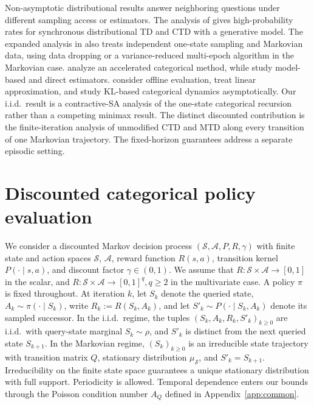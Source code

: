 \documentclass{article}
\newcommand{\X}{\mathcal{S}}
\newcommand{\A}{\mathcal{A}}
\begin{document}
Non-asymptotic distributional results answer neighboring questions under different sampling access or estimators. The analysis of \citet{peng2024statistical} gives high-probability rates for synchronous distributional TD and CTD with a generative model. The expanded analysis in \citep{peng2025statisticalefficiencydistributionaltemporal} also treats independent one-state sampling and Markovian data, using data dropping or a variance-reduced multi-epoch algorithm in the Markovian case. \citet{boeck2022speedy} analyze an accelerated categorical method, while \citet{zhang2023estimation,rowland2024near} study model-based and direct estimators. \citet{wu2023distributional} consider offline evaluation, \citet{peng2025finite} treat linear approximation, and \citet{kastner2025categorical} study KL-based categorical dynamics asymptotically. Our i.i.d.\ result is a contractive-SA analysis of the one-state categorical recursion rather than a competing minimax result. The distinct discounted contribution is the finite-iteration analysis of unmodified CTD and MTD along every transition of one Markovian trajectory. The fixed-horizon guarantees address a separate episodic setting.

\section{Discounted categorical policy evaluation}\label{sec:discounted}
We consider a discounted Markov decision process \citep{sutton1998reinforcement} $(\X,\A,P,R,\gamma)$ with finite state and action spaces $\X$, $\A$, reward function $R(s,a)$, transition kernel $P(\cdot\mid s,a)$, and discount factor $\gamma\in(0,1)$. We assume that $R:\X \times \A \to [0, 1]$ in the scalar, and $R:\X \times \A \to[0, 1]^q, q\ge2$ in the multivariate case. A policy $\pi$ is fixed throughout. At iteration $k$, let $S_k$ denote the queried state, $A_k\sim\pi(\cdot\mid S_k)$, write $R_k:=R(S_k,A_k)$, and let $S'_k\sim P(\cdot\mid S_k,A_k)$ denote its sampled successor. In the i.i.d.\ regime, the tuples $(S_k,A_k,R_k,S'_k)_{k\ge0}$ are i.i.d.\ with query-state marginal $S_k\sim\rho$, and $S'_k$ is distinct from the next queried state $S_{k+1}$. In the Markovian regime, $(S_k)_{k\ge0}$ is an irreducible state trajectory with transition matrix $Q$, stationary distribution $\mu_{\X}$, and $S'_k=S_{k+1}$. Irreducibility on the finite state space guarantees a unique stationary distribution with full support. Periodicity is allowed. Temporal dependence enters our bounds through the Poisson condition number $A_Q$ defined in Appendix~\ref{app:common}.
\end{document}
